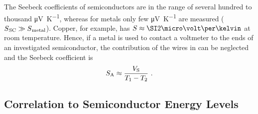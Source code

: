 The Seebeck coefficients of semiconductors are in the range of several hundred to thousand \si{\micro\volt\per\kelvin}, whereas for metals only few \si{\micro\volt\per\kelvin} are measured ($\S{}_\text{SC}\gg\S{}_\text{metal}$). Copper, for example, has $\S\approx\uVK{2}$ at room temperature\cite{DemtroederExp2}. %
Hence, if a metal is used to contact a voltmeter to the ends of an investigated semiconductor, the contribution of the wires in \lasteqn can be neglected and the Seebeck coefficient is
\begin{equation}
S_\text{A} \approx \frac{V_\text{S}}{T_1-T_2}
\label{eq:SeebeckMeasured}
~.
\end{equation}

\subsection{Correlation to Semiconductor Energy Levels}
